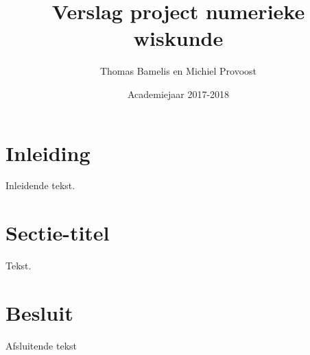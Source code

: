 \documentclass[a4paper,kulak]{kulakarticle}
\date{Academiejaar 2017-2018}
\title{Verslag project numerieke wiskunde}
\author{Thomas Bamelis en Michiel Provoost}
\begin{document}
\maketitle

\section*{Inleiding}

Inleidende tekst.

\section{Sectie-titel}

Tekst.

\section*{Besluit}

Afsluitende tekst
\end{document}
